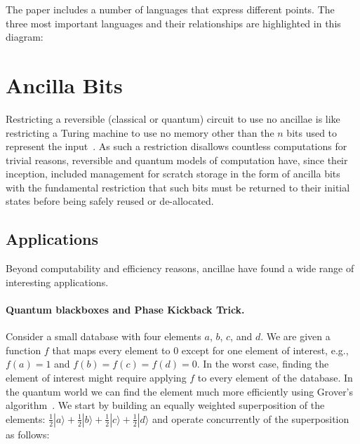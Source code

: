 \documentclass[sigplan,10pt,review,anonymous]{acmart}
\newcommand{\ket}[1]{|#1\rangle}
\begin{document}
The paper includes a number of languages that express different
points. The three most important languages and their relationships are
highlighted in this diagram:
\begin{center}

\end{center}

\section{Ancilla Bits}
\label{sec:examples}

Restricting a reversible (classical or quantum) circuit to use no
ancillae is like restricting a Turing machine to use no memory other
than the $n$ bits used to represent the
input~\cite{aaronson_et_al:LIPIcs:2017:8173}. As such a restriction
disallows countless computations for trivial reasons, reversible and
quantum models of computation have, since their inception, included
management for scratch storage in the form of ancilla
bits~\cite{Toffoli:1980} with the fundamental restriction that such
bits must be returned to their initial states before being safely
reused or de-allocated.

\subsection{Applications}

Beyond computability and efficiency reasons, ancillae have found a
wide range of interesting applications.

\paragraph*{Quantum blackboxes and Phase Kickback Trick.} Consider a
small database with four elements $a$, $b$, $c$, and $d$. We are given
a function $f$ that maps every element to $0$ except for one element
of interest, e.g., $f(a)=1$ and $f(b)=f(c)=f(d)=0$. In the worst case,
finding the element of interest might require applying $f$ to every
element of the database. In the quantum world we can find the element
much more efficiently using Grover's
algorithm~\cite{Grover:1996:FQM:237814.237866}. We start by building
an equally weighted superposition of the elements:
$\frac{1}{2}\ket{a}+\frac{1}{2}\ket{b}+\frac{1}{2}\ket{c}+\frac{1}{2}\ket{d}$
and operate concurrently of the superposition as follows:
\end{document}
